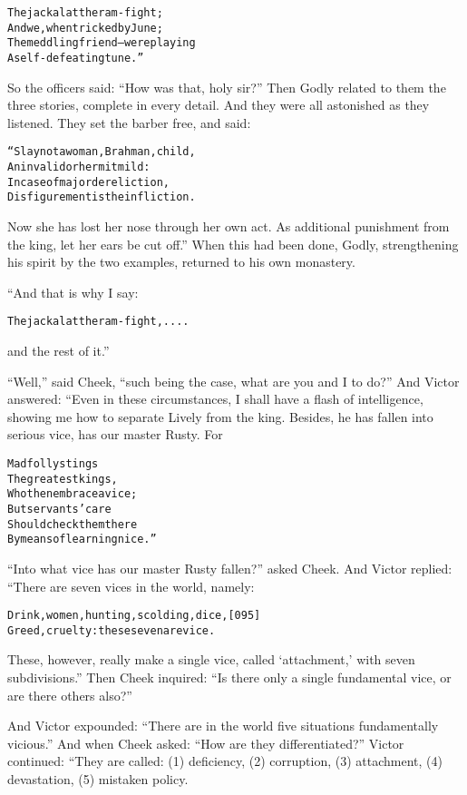 \documentclass{article}
\renewenvironment{verbatim}{\begin{alltt}\normalfont\begin{centering}}{\end{centering}\end{alltt}}
\begin{document}
\begin{verbatim}
The jackal at the ram-fight;
And we, when tricked by June;
The meddling friend--were playing
A self-defeating tune.”
\end{verbatim}
So the officers said: ``How was that, holy sir?'' Then Godly
related to them the three stories, complete in every detail. And
they were all astonished as they listened. They set the barber
free, and said:

\begin{verbatim}
“Slay not a woman, Brahman, child,
An invalid or hermit mild:
In case of major dereliction,
Disfigurement is the infliction.
\end{verbatim}
Now she has lost her nose through her own act. As additional
punishment from the king, let her ears be cut off.” When this had
been done, Godly, strengthening his spirit by the two examples,
returned to his own monastery.

“And that is why I say:

\begin{verbatim}
The jackal at the ram-fight, ....
\end{verbatim}
and the rest of it.”

``Well,'' said Cheek,
``such being the case, what are you and I to do?'' And Victor
answered: “Even in these circumstances, I shall have a flash of
intelligence, showing me how to separate Lively from the king.
Besides, he has fallen into serious vice, has our master Rusty.
For

\begin{verbatim}
Mad folly stings
The greatest kings,
    Who then embrace a vice;
But servants' care
Should check them there
    By means of learning nice.”
\end{verbatim}
``Into what vice has our master Rusty fallen?'' asked Cheek. And
Victor replied: “There are seven vices in the world, namely:

\begin{verbatim}
Drink, women, hunting, scolding, dice,                  [095]
Greed, cruelty: these seven are vice.
\end{verbatim}
These, however, really make a single vice, called `attachment,'
with seven subdivisions.” Then Cheek inquired:
``Is there only a single fundamental vice, or are there others also?''

And Victor expounded:
``There are in the world five situations fundamentally vicious.''
And when Cheek asked: ``How are they differentiated?'' Victor
continued: “They are called: (1) deficiency, (2) corruption, (3)
attachment, (4) devastation, (5) mistaken policy.
\end{document}
